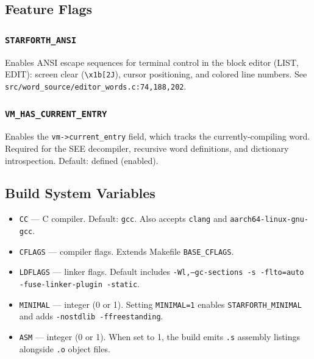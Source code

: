\subsection{Feature Flags}
\label{sec:build-features}

\subsubsection{\texttt{STARFORTH\_ANSI}}

Enables ANSI escape sequences for terminal control in the block editor
(LIST, EDIT): screen clear (\texttt{\textbackslash x1b[2J}), cursor
positioning, and colored line numbers. See
\texttt{src/word\_source/editor\_words.c:74,188,202}.

\subsubsection{\texttt{VM\_HAS\_CURRENT\_ENTRY}}

Enables the \texttt{vm->current\_entry} field, which tracks the
currently-compiling word. Required for the SEE decompiler, recursive word
definitions, and dictionary introspection. Default: defined (enabled).

\subsection{Build System Variables}
\label{sec:build-vars}

\begin{itemize}
  \item \texttt{CC} — C compiler. Default: \texttt{gcc}. Also accepts \texttt{clang} and \texttt{aarch64-linux-gnu-gcc}.
  \item \texttt{CFLAGS} — compiler flags. Extends Makefile \texttt{BASE\_CFLAGS}.
  \item \texttt{LDFLAGS} — linker flags. Default includes \texttt{-Wl,--gc-sections -s -flto=auto -fuse-linker-plugin -static}.
  \item \texttt{MINIMAL} — integer (0 or 1). Setting \texttt{MINIMAL=1} enables \texttt{STARFORTH\_MINIMAL} and adds \texttt{-nostdlib -ffreestanding}.
  \item \texttt{ASM} — integer (0 or 1). When set to 1, the build emits \texttt{.s} assembly listings alongside \texttt{.o} object files.
\end{itemize}

